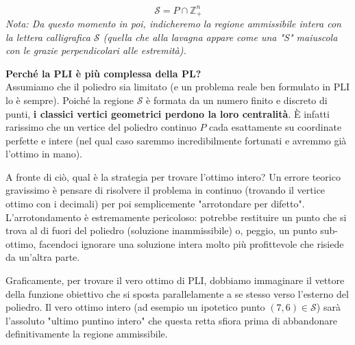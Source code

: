 \documentclass[12pt, a4paper]{article}
\begin{document}
	$$\mathcal{S} = P \cap \mathbb{Z}^n_+$$
	\textit{Nota: Da questo momento in poi, indicheremo la regione ammissibile intera con la lettera calligrafica $\mathcal{S}$ (quella che alla lavagna appare come una "S" maiuscola con le grazie perpendicolari alle estremità).}
	
	\vspace{0.4cm}
	\textbf{Perché la PLI è più complessa della PL?}\\
	Assumiamo che il poliedro sia limitato (e un problema reale ben formulato in PLI lo è sempre). Poiché la regione $\mathcal{S}$ è formata da un numero finito e discreto di punti, \textbf{i classici vertici geometrici perdono la loro centralità}. È infatti rarissimo che un vertice del poliedro continuo $P$ cada esattamente su coordinate perfette e intere (nel qual caso saremmo incredibilmente fortunati e avremmo già l'ottimo in mano).
	
	A fronte di ciò, qual è la strategia per trovare l'ottimo intero? 
	Un errore teorico gravissimo è pensare di risolvere il problema in continuo (trovando il vertice ottimo con i decimali) per poi semplicemente "arrotondare per difetto". L'arrotondamento è estremamente pericoloso: potrebbe restituire un punto che si trova al di fuori del poliedro (soluzione inammissibile) o, peggio, un punto sub-ottimo, facendoci ignorare una soluzione intera molto più profittevole che risiede da un'altra parte.
	
	Graficamente, per trovare il vero ottimo di PLI, dobbiamo immaginare il vettore della funzione obiettivo che si sposta parallelamente a se stesso verso l'esterno del poliedro. Il vero ottimo intero (ad esempio un ipotetico punto $(7,6) \in \mathcal{S}$) sarà l'assoluto "ultimo puntino intero" che questa retta sfiora prima di abbandonare definitivamente la regione ammissibile. 
	
\end{document}
